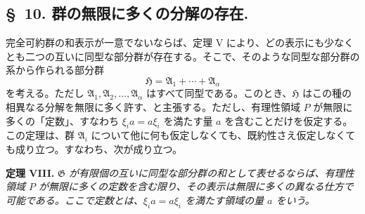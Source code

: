 
\setcounter{footnote}{19}
\subsection*{\S~10. 群の無限に多くの分解の存在.}

完全可約群の和表示が一意でないならば、定理 V により、どの表示にも少なくとも二つの互いに同型な部分群が存在する。そこで、そのような同型な部分群の系から作られる部分群
\[
  \mathfrak H=\mathfrak A_1+\cdots+\mathfrak A_\alpha
\]
を考える。ただし $\mathfrak A_1,\mathfrak A_2,\ldots,\mathfrak A_\alpha$ はすべて同型である。このとき、$\mathfrak H$ はこの種の相異なる分解を無限に多く許す、と主張する。ただし、有理性領域 $P$ が無限に多くの「定数」、すなわち $\xi_i a=a\xi_i$ を満たす量 $a$ を含むことだけを仮定する。この定理は、群 $\mathfrak A_i$ について他に何も仮定しなくても、既約性さえ仮定しなくても成り立つ。すなわち、次が成り立つ。

\textbf{定理 VIII.} \emph{$\mathfrak G$ が有限個の互いに同型な部分群の和として表せるならば、有理性領域 $P$ が無限に多くの定数を含む限り、その表示は無限に多くの異なる仕方で可能である。ここで定数とは、$\xi_i a=a\xi_i$ を満たす領域の量 $a$ をいう。}

